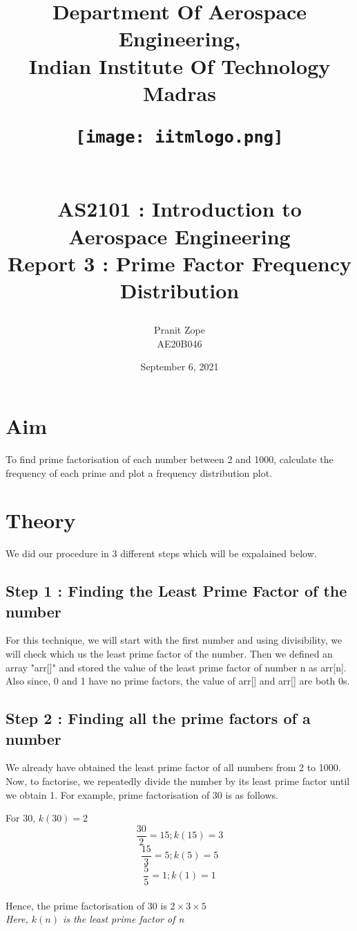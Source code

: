 \documentclass[12pt]{article}
\title{
    Department Of Aerospace Engineering,\\
    Indian Institute Of Technology Madras
    \begin{figure}[H]
        \centering
        \texttt{[image: iitmlogo.png]}
    \end{figure}
    \begin{center}
        \textbf{\\AS2101 : Introduction to Aerospace Engineering\\}
        Report 3 : Prime Factor Frequency Distribution\\
    \end{center}
}
\author{
    Pranit Zope\\AE20B046
}
\date{September 6, 2021}
\begin{document}
\maketitle
\newpage
{}
\tableofcontents 
\listoffigures

\newpage

\section{Aim}
   To find prime factorisation of each number between 2 and 1000, calculate the frequency of each prime and plot a frequency distribution plot.

\section{Theory}
    We did our procedure in 3 different steps which will be expalained below.
    \subsection{Step 1 : Finding the Least Prime Factor of the number}
        For this technique, we will start with the first number and using divisibility, we will check which us the least prime factor of the number. Then we defined an array "arr[]" and stored the value of the least prime factor of number n as arr[n].\\
        Also since, 0 and 1 have no prime factors, the value of arr[] and arr[] are both 0s.
    
    \subsection{Step 2 : Finding all the prime factors of a number}
        We already have obtained the least prime factor of all numbers from 2 to 1000. Now, to factorise, we repeatedly divide the number by its least prime factor until we obtain 1. For example, prime factorisation of 30 is as follows.
        
        For 30, $k(30)=2$\\
        \begin{equation*}
            \frac{30}{2}=15 ; k(15) = 3
        \end{equation*}
        \begin{equation*}
            \frac{15}{3}=5 ; k(5) = 5
        \end{equation*}
        \begin{equation*}
            \frac{5}{5}=1 ; k(1)=1
        \end{equation*}
        \\Hence,  the prime factorisation of 30 is $2 \times 3 \times 5$\\
        \textit{Here, $k(n)$ is the least prime factor of n}
     
\end{document}
